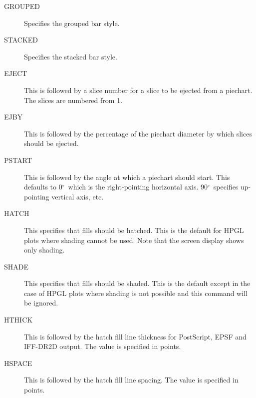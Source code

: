 \documentclass{report}
\newcommand{\degree}{\mbox{$\mbox{}^\circ$}}
\begin{document}
\begin{description}
\item[GROUPED] Specifies the grouped bar style.
\item[STACKED] Specifies the stacked bar style.
\item[EJECT] This is followed by  a slice number for a slice to be ejected from a 
piechart. The slices are numbered from 1.
\item[EJBY] This is followed by the percentage of the piechart diameter by which 
slices should be ejected.
\item[PSTART] This is followed by the angle at which a piechart should start. This 
defaults to 0\degree\ which is the right-pointing horizontal axis. 90\degree\ 
specifies up-pointing vertical axis, etc.
\item[HATCH] This specifies that fills should be hatched. This is the default for 
HPGL plots where shading cannot be used. Note that the screen display shows only 
shading.
\item[SHADE] This specifies that fills should be shaded. This is the default except 
in the case of HPGL plots where shading is not possible and this command will be 
ignored.
\item[HTHICK] This is followed by the hatch fill line thickness for PostScript, EPSF 
and IFF-DR2D output. The value is specified in points.
\item[HSPACE] This is followed by the hatch fill line spacing. The value is 
specified in points.
\end{description}
\end{document}

